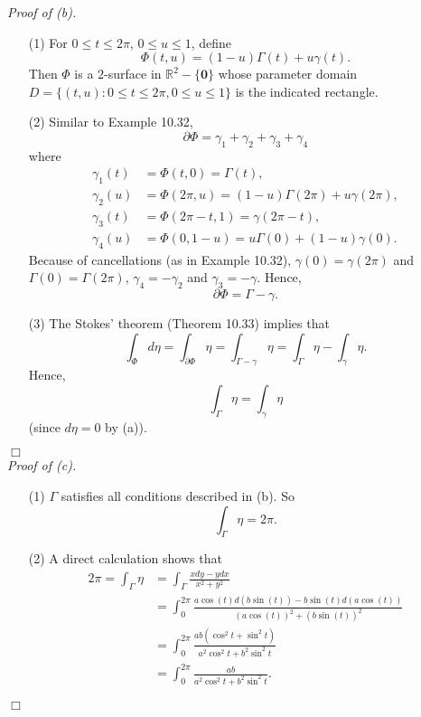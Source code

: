 \documentclass{article}
\begin{document}
\emph{Proof of (b).}
\begin{enumerate}
\item[(1)]
  For $0 \leq t \leq 2\pi$, $0 \leq u \leq 1$, define
  \[
    \Phi(t,u) = (1-u)\Gamma(t) + u\gamma(t).
  \]
  Then $\Phi$ is a $2$-surface in $\mathbb{R}^2 - \{\mathbf{0}\}$
  whose parameter domain
  $D = \{(t,u) : 0 \leq t \leq 2\pi, 0 \leq u \leq 1 \}$ is the indicated rectangle.

\item[(2)]
  Similar to Example 10.32,
  \[
    \partial \Phi = \gamma_1 + \gamma_2 + \gamma_3 + \gamma_4
  \]
  where
  \begin{align*}
    \gamma_1(t) &= \Phi(t,0) = \Gamma(t), \\
    \gamma_2(u) &= \Phi(2\pi,u) = (1-u)\Gamma(2\pi) + u\gamma(2\pi), \\
    \gamma_3(t) &= \Phi(2\pi-t,1) = \gamma(2\pi-t), \\
    \gamma_4(u) &= \Phi(0,1-u) = u\Gamma(0) + (1-u)\gamma(0).
  \end{align*}
  Because of cancellations (as in Example 10.32), $\gamma(0) = \gamma(2\pi)$
  and $\Gamma(0) = \Gamma(2\pi)$,
  $\gamma_4 = -\gamma_2$ and $\gamma_3 = -\gamma$.
  Hence,
  \[
    \partial \Phi = \Gamma - \gamma.
  \]

\item[(3)]
  The Stokes' theorem (Theorem 10.33) implies that
  \[
    \int_{\Phi} d\eta
    = \int_{\partial\Phi} \eta
    = \int_{\Gamma - \gamma} \eta
    = \int_{\Gamma} \eta - \int_{\gamma} \eta.
  \]
  Hence,
  \[
    \int_{\Gamma} \eta = \int_{\gamma} \eta
  \]
  (since $d\eta = 0$ by (a)).
\end{enumerate}
$\Box$ \\



\emph{Proof of (c).}
\begin{enumerate}
\item[(1)]
  $\Gamma$ satisfies all conditions described in (b).
  So
  \[
    \int_{\Gamma} \eta = 2\pi.
  \]

\item[(2)]
  A direct calculation shows that
  \begin{align*}
    2\pi = \int_{\Gamma} \eta
    &= \int_{\Gamma} \frac{x dy - y dx}{x^2+y^2} \\
    &= \int_{0}^{2\pi}
      \frac{a \cos(t) d(b \sin(t)) - b \sin(t) d(a \cos(t))}{(a \cos(t))^2+(b \sin(t))^2} \\
    &= \int_{0}^{2\pi}
      \frac{ab (\cos^2 t + \sin^2 t)}{a^2\cos^2 t + b^2 \sin^2 t} \\
    &= \int_{0}^{2\pi}
      \frac{ab}{a^2\cos^2 t + b^2 \sin^2 t}.
  \end{align*}
\end{enumerate}
$\Box$ \\
\end{document}
